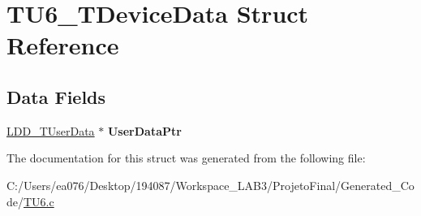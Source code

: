 \hypertarget{struct_t_u6___t_device_data}{\section{T\-U6\-\_\-\-T\-Device\-Data Struct Reference}
\label{struct_t_u6___t_device_data}
}
\subsection*{Data Fields}
\begin{DoxyCompactItemize}
\item 
\hypertarget{struct_t_u6___t_device_data_a3da710c972fa932af8856615550548e1}{\hyperlink{group___p_e___types__module_ga0b66a73f87238a782318aa0be7578e35}{L\-D\-D\-\_\-\-T\-User\-Data} $\ast$ {\bfseries User\-Data\-Ptr}}\label{struct_t_u6___t_device_data_a3da710c972fa932af8856615550548e1}

\end{DoxyCompactItemize}


The documentation for this struct was generated from the following file\-:\begin{DoxyCompactItemize}
\item 
C\-:/\-Users/ea076/\-Desktop/194087/\-Workspace\-\_\-\-L\-A\-B3/\-Projeto\-Final/\-Generated\-\_\-\-Code/\hyperlink{_t_u6_8c}{T\-U6.\-c}\end{DoxyCompactItemize}
